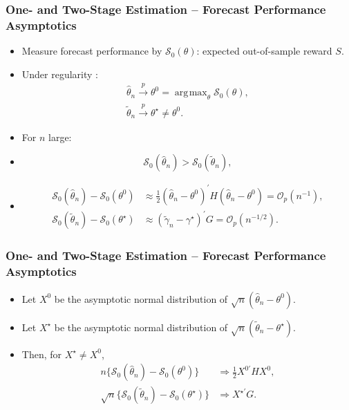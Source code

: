 \documentclass[aspectratio=169]{beamer}
\DeclareMathOperator*{\argmax}{\arg\!\max}
\begin{document}
\begin{frame}
\frametitle{One- and Two-Stage Estimation -- Forecast Performance Asymptotics}
\begin{itemize}
\item<2-> Measure forecast performance by $\mathcal{S}_0(\theta)$: expected out-of-sample reward $S$.
\item<3-> Under regularity \citep{Newey1994}:
\begin{gather*}
\hat{\theta}_n \overset{p}{\to} \theta^0 = \argmax_{\theta} \mathcal{S}_0(\theta), \\
\tilde{\theta}_n \overset{p}{\to} \theta^{\star} \neq \theta^0.
\end{gather*}
\item<4-> For $n$ large:
\item<5->[] \begin{equation*}
\mathcal{S}_0(\hat{\theta}_n) > \mathcal{S}_0(\tilde{\theta}_n),
\end{equation*}
\item<6->[] \begin{align*}
\mathcal{S}_0(\hat{\theta}_n) - \mathcal{S}_0(\theta^0) &\approx \frac{1}{2} (\hat{\theta}_n - \theta^0)^{\prime} H (\hat{\theta}_n - \theta^0) = \mathcal{O}_p(n^{-1}), \\
\mathcal{S}_0(\tilde{\theta}_n) - \mathcal{S}_0(\theta^{\star}) &\approx (\tilde{\gamma}_n - \gamma^{\star})^{\prime} G = \mathcal{O}_p(n^{-1/2}). 
\end{align*}
\end{itemize}
\end{frame}

\begin{frame}
\frametitle{One- and Two-Stage Estimation -- Forecast Performance Asymptotics}
\begin{itemize}
\item<1-> Let $X^0$ be the asymptotic normal distribution of $\sqrt{n}(\hat{\theta}_n - \theta^0)$.
\vspace{\negspace}
\item<2-> Let $X^{\star}$ be the asymptotic normal distribution of $\sqrt{n}(\tilde{\theta}_n - \theta^{\star})$.
\vspace{\negspace}
\item<3-> Then, for $X^{\star} \ne X^0$,
\vspace{\negspace}
\begin{align*}
n \{ \mathcal{S}_0(\hat{\theta}_n) - \mathcal{S}_0(\theta^0) \} &\Rightarrow \frac{1}{2} X^{0 \prime} H X^0, \\[8mm]
\sqrt{n} \{ \mathcal{S}_0(\tilde{\theta}_n) - \mathcal{S}_0(\theta^{\star}) \} &\Rightarrow X^{\star \prime} G.
\end{align*}
\end{itemize}
\end{frame}
\end{document}
